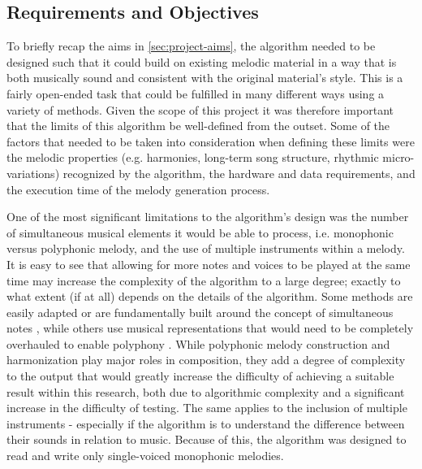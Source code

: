 \documentclass[ author={Stephen Livermore-Tozer},
				supervisor={Dr. Peter Flach},
				degree={MEng},
				title={Algorithmic Co-composition Using Machine Learning},
				subtitle={},
				type={research},
				year={2016} ]{dissertation}
\begin{document}
	\subsection{Requirements and Objectives}
	
	To briefly recap the aims in \ref{sec:project-aims}, the algorithm needed to be designed such that it could build on existing melodic material in a way that is both musically sound and consistent with the original material's style. This is a fairly open-ended task that could be fulfilled in many different ways using a variety of methods. Given the scope of this project it was therefore important that the limits of this algorithm be well-defined from the outset. Some of the factors that needed to be taken into consideration when defining these limits were the melodic properties (e.g. harmonies, long-term song structure, rhythmic micro-variations) recognized by the algorithm, the hardware and data requirements, and the execution time of the melody generation process. 
	
	One of the most significant limitations to the algorithm's design was the number of simultaneous musical elements it would be able to process, i.e. monophonic versus polyphonic melody, and the use of multiple instruments within a melody. It is easy to see that allowing for more notes and voices to be played at the same time may increase the complexity of the algorithm to a large degree; exactly to what extent (if at all) depends on the details of the algorithm. Some methods are easily adapted or are fundamentally built around the concept of simultaneous notes \cite{boenn2008automatic}, while others use musical representations that would need to be completely overhauled to enable polyphony \cite{todd1989connectionist}. While polyphonic melody construction and harmonization play major roles in composition, they add a degree of complexity to the output that would greatly increase the difficulty of achieving a suitable result within this research, both due to algorithmic complexity and a significant increase in the difficulty of testing. The same applies to the inclusion of multiple instruments - especially if the algorithm is to understand the difference between their sounds in relation to music. Because of this, the algorithm was designed to read and write only single-voiced monophonic melodies. 
	
\end{document}
